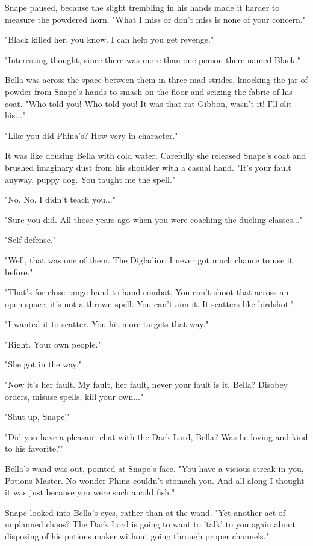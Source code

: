 \documentclass[a4paper,11pt]{article}
\begin{document}
Snape paused, because the slight trembling in his hands made it harder to measure the powdered horn. "What I miss or don't miss is none of your concern."

"Black killed her, you know. I can help you get revenge."

"Interesting thought, since there was more than one person there named Black."

Bella was across the space between them in three mad strides, knocking the jar of powder from Snape's hands to smash on the floor and seizing the fabric of his coat. "Who told you! Who told you! It was that rat Gibbon, wasn't it! I'll slit his..."

"Like you did Phina's? How very in character."

It was like dousing Bella with cold water. Carefully she released Snape's coat and brushed imaginary dust from his shoulder with a casual hand. "It's your fault anyway, puppy dog. You taught me the spell."

"No. No, I didn't teach you..."

"Sure you did. All those years ago when you were coaching the dueling classes..."

"Self defense."

"Well, that was one of them. The Digladior. I never got much chance to use it before."

"That's for close range hand-to-hand combat. You can't shoot that across an open space, it's not a thrown spell. You can't aim it. It scatters like birdshot."

"I wanted it to scatter. You hit more targets that way."

"Right. Your own people."

"She got in the way."

"Now it's her fault. My fault, her fault, never your fault is it, Bella? Disobey orders, misuse spells, kill your own..."

"Shut up, Snape!"

"Did you have a pleasant chat with the Dark Lord, Bella? Was he loving and kind to his favorite?"

Bella's wand was out, pointed at Snape's face. "You have a vicious streak in you, Potions Master. No wonder Phina couldn't stomach you. And all along I thought it was just because you were such a cold fish."

Snape looked into Bella's eyes, rather than at the wand. "Yet another act of unplanned chaos? The Dark Lord is going to want to 'talk' to you again about disposing of his potions maker without going through proper channels."
\end{document}

